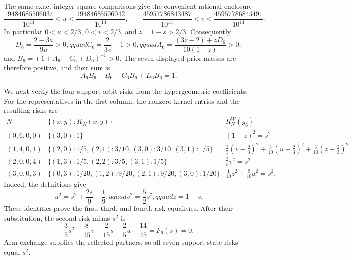 The same exact integer-square comparisons give the convenient rational enclosure
\[
 \frac{19484685506037}{10^{14}}<u<\frac{19484685506042}{10^{14}},
 \qquad
 \frac{45957786843487}{10^{14}}<v<\frac{45957786843491}{10^{14}}.
\]
In particular \(0<u<2/3\), \(0<v<2/3\), and \(z=1-s>2/3\).  Consequently
\[
 D_6=\frac{2-3u}{9u}>0,qquad
 C_6=\frac2{3v}-1>0,qquad
 A_6=\frac{(3z-2)+zD_6}{10(1-z)}>0,
\]
and \(B_6=(1+A_6+C_6+D_6)^{-1}>0\).  The seven displayed prior masses are therefore positive, and their sum is
\[
 A_6B_6+B_6+C_6B_6+D_6B_6=1.
\]

We next verify the four support-orbit risks from the hypergeometric coefficients.  For the representatives in the first column, the nonzero kernel entries and the resulting risks are
\[
\begin{array}{c|c|c}
N&\{(x,y):K_N(x,y)\}&R_N^W(g_6)\\ \hline
(0,6,0,0)&\{(3,0):1\}&(1-z)^2=s^2\\
(1,4,0,1)&\{(2,0):1/5,(2,1):3/10,(3,0):3/10,(3,1):1/5\}
&\frac25(v-\frac23)^2+\frac3{10}(u-\frac23)^2+\frac3{10}(z-\frac23)^2\\
(2,0,0,4)&\{(1,3):1/5,(2,2):3/5,(3,1):1/5\}&\frac25v^2=s^2\\
(3,0,0,3)&\{(0,3):1/20,(1,2):9/20,(2,1):9/20,(3,0):1/20\}
&\frac1{10}z^2+\frac9{10}u^2=s^2.
\end{array}
\]
Indeed, the definitions give
\[
 u^2=s^2+\frac{2s}{9}-\frac19,qquad
 v^2=\frac52s^2,qquad z=1-s.
\]
These identities prove the first, third, and fourth risk equalities.  After their substitution, the second risk minus \(s^2\) is
\[
 \frac35s^2-\frac8{15}v-\frac2{15}s-\frac25u+\frac{14}{45}
 =F_6(s)=0.
\]
Arm exchange supplies the reflected partners, so all seven support-state risks equal \(s^2\).

